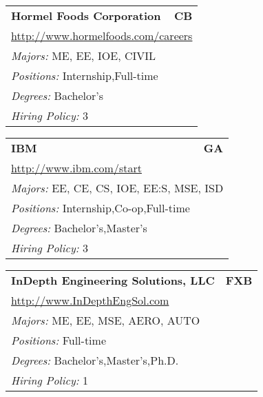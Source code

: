\documentclass[twoside]{article}
\begin{document}
\begin{center}
\begin{multicols}{3}
\begin{FlushLeft}
\begin{minipage}{\columnwidth}
\end{minipage}
 
\begin{minipage}{\columnwidth}\begin{tabularx}{.95\columnwidth}{Xr}
                 {\Large\bf Hormel Foods Corporation} & {\Large\bf CB}\\
    \multicolumn{2}{p{.95\columnwidth}}{\url{http://www.hormelfoods.com/careers}}\\
    \multicolumn{2}{p{.95\columnwidth}}{\emph{Majors:} ME, EE, IOE, CIVIL}\\
    \multicolumn{2}{p{.95\columnwidth}}{\emph{Positions:} Internship,Full-time}\\
    \multicolumn{2}{p{.95\columnwidth}}{\emph{Degrees:} Bachelor's}\\
    \multicolumn{2}{p{.95\columnwidth}}{\emph{Hiring Policy:} 3}\\
    \end{tabularx}
    
\end{minipage}
 
\begin{minipage}{\columnwidth}\begin{tabularx}{.95\columnwidth}{Xr}
                 {\Large\bf IBM} & {\Large\bf GA}\\
    \multicolumn{2}{p{.95\columnwidth}}{\url{http://www.ibm.com/start}}\\
    \multicolumn{2}{p{.95\columnwidth}}{\emph{Majors:} EE, CE, CS, IOE, EE:S, MSE, ISD}\\
    \multicolumn{2}{p{.95\columnwidth}}{\emph{Positions:} Internship,Co-op,Full-time}\\
    \multicolumn{2}{p{.95\columnwidth}}{\emph{Degrees:} Bachelor's,Master's}\\
    \multicolumn{2}{p{.95\columnwidth}}{\emph{Hiring Policy:} 3}\\
    \end{tabularx}
    
\end{minipage}
 
\begin{minipage}{\columnwidth}\begin{tabularx}{.95\columnwidth}{Xr}
                 {\Large\bf InDepth Engineering Solutions, LLC} & {\Large\bf FXB}\\
    \multicolumn{2}{p{.95\columnwidth}}{\url{http://www.InDepthEngSol.com}}\\
    \multicolumn{2}{p{.95\columnwidth}}{\emph{Majors:} ME, EE, MSE, AERO, AUTO}\\
    \multicolumn{2}{p{.95\columnwidth}}{\emph{Positions:} Full-time}\\
    \multicolumn{2}{p{.95\columnwidth}}{\emph{Degrees:} Bachelor's,Master's,Ph.D.}\\
    \multicolumn{2}{p{.95\columnwidth}}{\emph{Hiring Policy:} 1}\\
    \end{tabularx}
    

\end{minipage}
\end{FlushLeft}
\end{multicols}
\end{center}
\end{document}
